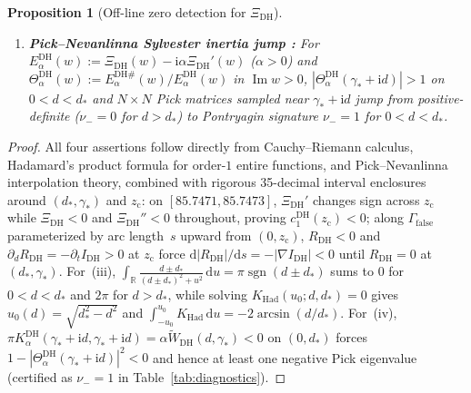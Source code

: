 \documentclass[11pt,reqno]{amsart}
\newtheorem{proposition}[theorem]{Proposition}
\theoremstyle{definition}
\theoremstyle{remark}
\numberwithin{equation}{section}
\newcommand{\R}{\mathbb{R}}
\newcommand{\dd}{\mathrm{d}}
\newcommand{\ii}{\mathrm{i}}
\DeclareMathOperator{\Imop}{Im}
\DeclareMathOperator{\sgn}{sgn}
\begin{document}
\begin{proposition}[Off-line zero detection for $\Xi_{\mathrm{DH}}$]
\begin{enumerate}[label=\textup{(\roman*)},leftmargin=2.2em]
  \item \textbf{Pick--Nevanlinna Sylvester inertia jump \cite{debranges1968}:} For $E_\alpha^{\mathrm{DH}}(w) := \Xi_{\mathrm{DH}}(w) - \ii\alpha\Xi_{\mathrm{DH}}'(w)$ ($\alpha > 0$) and $\Theta_\alpha^{\mathrm{DH}}(w) := E_\alpha^{\mathrm{DH}\#}(w)/E_\alpha^{\mathrm{DH}}(w)$ in $\Imop w > 0$, $|\Theta_\alpha^{\mathrm{DH}}(\gamma_* + \ii d)| > 1$ on $0 < d < d_*$ and $N\times N$ Pick matrices sampled near $\gamma_* + \ii d$ jump from positive-definite ($\nu_- = 0$ for $d > d_*$) to Pontryagin signature $\nu_- = 1$ for $0 < d < d_*$.
\end{enumerate}
\end{proposition}

\begin{proof}
All four assertions follow directly from Cauchy--Riemann calculus, Hadamard's product formula for order-$1$ entire functions, and Pick--Nevanlinna interpolation theory, combined with rigorous 35-decimal interval enclosures around $(d_*,\gamma_*)$ and $z_{\mathrm{c}}$: on $[85.7471, 85.7473]$, $\Xi_{\mathrm{DH}}'$ changes sign across $z_{\mathrm{c}}$ while $\Xi_{\mathrm{DH}} < 0$ and $\Xi_{\mathrm{DH}}'' < 0$ throughout, proving $c_1^{\mathrm{DH}}(z_{\mathrm{c}}) < 0$; along $\Gamma_{\mathrm{false}}$ parameterized by arc length~$s$ upward from $(0,z_{\mathrm{c}})$, $R_{\mathrm{DH}} < 0$ and $\partial_d R_{\mathrm{DH}} = -\partial_t I_{\mathrm{DH}} > 0$ at $z_{\mathrm{c}}$ force $\dd|R_{\mathrm{DH}}|/\dd s = -|\nabla I_{\mathrm{DH}}| < 0$ until $R_{\mathrm{DH}}=0$ at $(d_*,\gamma_*)$. For~(iii), $\int_{\R}\frac{d\pm d_*}{(d\pm d_*)^2+u^2}\,\dd u = \pi\sgn(d\pm d_*)$ sums to $0$ for $0 < d < d_*$ and $2\pi$ for $d > d_*$, while solving $K_{\mathrm{Had}}(u_0;d,d_*)=0$ gives $u_0(d) = \sqrt{d_*^2 - d^2}$ and $\int_{-u_0}^{u_0} K_{\mathrm{Had}}\,\dd u = -2\arcsin(d/d_*)$. For~(iv), $\pi K_\alpha^{\mathrm{DH}}(\gamma_*+\ii d,\gamma_*+\ii d) = \alpha\widetilde{W}_{\mathrm{DH}}(d,\gamma_*) < 0$ on $(0,d_*)$ forces $1 - |\Theta_\alpha^{\mathrm{DH}}(\gamma_*+\ii d)|^2 < 0$ and hence at least one negative Pick eigenvalue (certified as $\nu_- = 1$ in Table~\ref{tab:diagnostics}).
\end{proof}
\end{document}
